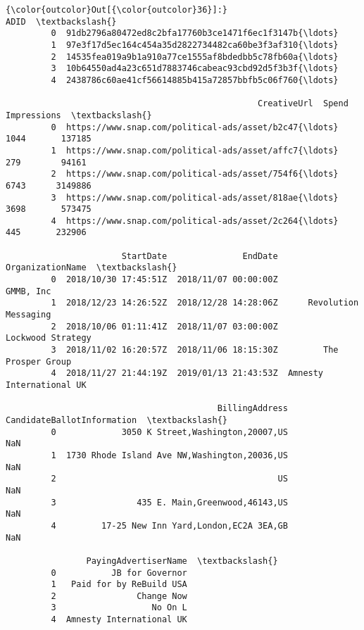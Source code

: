 \documentclass[11pt]{article}
\begin{document}
\begin{Verbatim}[commandchars=\\\{\}]
{\color{outcolor}Out[{\color{outcolor}36}]:}                                                 ADID  \textbackslash{}
         0  91db2796a80472ed8c2bfa17760b3ce1471f6ec1f3147b{\ldots}   
         1  97e3f17d5ec164c454a35d2822734482ca60be3f3af310{\ldots}   
         2  14535fea019a9b1a910a77ce1555af8bdedbb5c78fb60a{\ldots}   
         3  10b64550ad4a23c651d7883746cabeac93cbd92d5f3b3f{\ldots}   
         4  2438786c60ae41cf56614885b415a72857bbfb5c06f760{\ldots}   
         
                                                  CreativeUrl  Spend  Impressions  \textbackslash{}
         0  https://www.snap.com/political-ads/asset/b2c47{\ldots}   1044       137185   
         1  https://www.snap.com/political-ads/asset/affc7{\ldots}    279        94161   
         2  https://www.snap.com/political-ads/asset/754f6{\ldots}   6743      3149886   
         3  https://www.snap.com/political-ads/asset/818ae{\ldots}   3698       573475   
         4  https://www.snap.com/political-ads/asset/2c264{\ldots}    445       232906   
         
                       StartDate               EndDate          OrganizationName  \textbackslash{}
         0  2018/10/30 17:45:51Z  2018/11/07 00:00:00Z                 GMMB, Inc   
         1  2018/12/23 14:26:52Z  2018/12/28 14:28:06Z      Revolution Messaging   
         2  2018/10/06 01:11:41Z  2018/11/07 03:00:00Z         Lockwood Strategy   
         3  2018/11/02 16:20:57Z  2018/11/06 18:15:30Z         The Prosper Group   
         4  2018/11/27 21:44:19Z  2019/01/13 21:43:53Z  Amnesty International UK   
         
                                          BillingAddress CandidateBallotInformation  \textbackslash{}
         0             3050 K Street,Washington,20007,US                        NaN   
         1  1730 Rhode Island Ave NW,Washington,20036,US                        NaN   
         2                                            US                        NaN   
         3                435 E. Main,Greenwood,46143,US                        NaN   
         4         17-25 New Inn Yard,London,EC2A 3EA,GB                        NaN   
         
                PayingAdvertiserName  \textbackslash{}
         0           JB for Governor   
         1   Paid for by ReBuild USA   
         2                Change Now   
         3                   No On L   
         4  Amnesty International UK   
         

\end{Verbatim}
\end{document}
